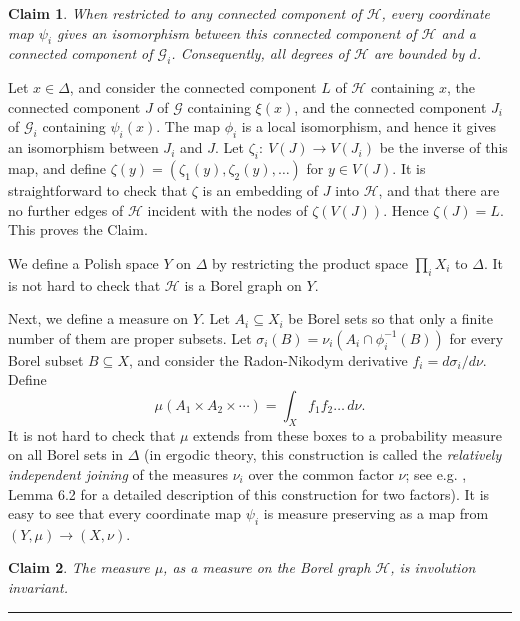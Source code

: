 \documentclass{article}
\newtheorem{claim}{Claim}
\newenvironment{proof}{{\bf Proof.}}{\hfill\rule{2mm}{2mm}\medskip}
\def\GG{\mathcal{G}}\def\HH{\mathcal{H}}\def\II{\mathcal{I}}
\begin{document}
{\begin{proof}
\begin{claim}\label{CLAIM:LOCFIN}
When restricted to any connected component of $\HH$, every coordinate
map $\psi_i$ gives an isomorphism between this connected component of
$\HH$ and a connected component of $\GG_i$. Consequently, all degrees
of $\HH$ are bounded by $d$.
\end{claim}

Let $x\in\Delta$, and consider the connected component $L$ of $\HH$
containing $x$, the connected component $J$ of $\GG$ containing
$\xi(x)$, and the connected component $J_i$ of $\GG_i$ containing
$\psi_i(x)$. The map $\phi_i$ is a local isomorphism, and hence it
gives an isomorphism between $J_i$ and $J$. Let $\zeta_i:~V(J)\to
V(J_i)$ be the inverse of this map, and define $\zeta(y)=
(\zeta_1(y),\zeta_2(y),\dots)$ for $y\in V(J)$. It is straightforward
to check that $\zeta$ is an embedding of $J$ into $\HH$, and that
there are no further edges of $\HH$ incident with the nodes of
$\zeta(V(J))$. Hence $\zeta(J)=L$. This proves the Claim.

We define a Polish space $Y$ on $\Delta$ by restricting the product
space $\prod_i X_i$ to $\Delta$. It is not hard to check that $\HH$
is a Borel graph on $Y$.

Next, we define a measure on $Y$. Let $A_i\subseteq X_i$ be Borel
sets so that only a finite number of them are proper subsets. Let
$\sigma_i(B)=\nu_i(A_i\cap\phi_i^{-1}(B))$ for every Borel subset
$B\subseteq X$, and consider the Radon-Nikodym derivative
$f_i=d\sigma_i/d\nu$. Define
\begin{equation}\label{EQ:MEASURE}
\mu(A_1\times A_2\times\cdots) = \int_X f_1f_2\dots\,d\nu.
\end{equation}
It is not hard to check that $\mu$ extends from these boxes to a
probability measure on all Borel sets in $\Delta$ (in ergodic theory,
this construction is called the {\it relatively independent joining}
of the measures $\nu_i$ over the common factor $\nu$; see e.g.
\cite{BCL}, Lemma 6.2 for a detailed description of this construction
for two factors). It is easy to see that every coordinate map
$\psi_i$ is measure preserving as a map from $(Y,\mu)\to(X,\nu)$.

\begin{claim}\label{CLAIM:MPRES}
The measure $\mu$, as a measure on the Borel graph $\HH$, is
involution invariant.
\end{claim}


\end{proof}}
\end{document}
